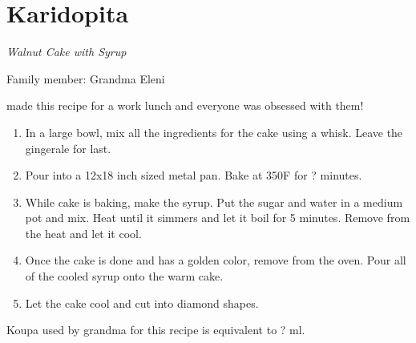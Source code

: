 \chapter{Karidopita}
\label{ch:karidopita}


\textit{Walnut Cake with Syrup}

Family member: Grandma Eleni

 made this recipe for a work lunch and everyone was obsessed with them!

\begin{enumerate}
    \item In a large bowl, mix all the ingredients for the cake using a whisk. Leave the gingerale for last.
    \item Pour into a 12x18 inch sized metal pan. Bake at 350\degree F for ? minutes.
    \item While cake is baking, make the syrup. Put the sugar and water in a medium pot and mix. Heat until it simmers and let it boil for 5 minutes. Remove from the heat and let it cool.
    \item Once the cake is done and has a golden color, remove from the oven. Pour all of the cooled syrup onto the warm cake.
    \item Let the cake cool and cut into diamond shapes.
\end{enumerate}

Koupa used by grandma for this recipe is equivalent to ? ml.


